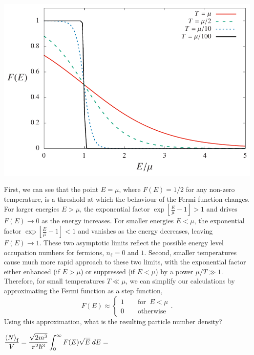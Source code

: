 \begin{center}\includegraphics[width=\textwidth]{figs/week09_dist.pdf}\end{center}

First, we can see that the point $E = \mu$, where $F(E) = 1 / 2$ for any non-zero temperature, is a threshold at which the behaviour of the Fermi function changes.
For larger energies $E > \mu$, the exponential factor $\exp\left[\frac{E}{\mu} - 1\right] > 1$ and drives $F(E) \to 0$ as the energy increases.
For smaller energies $E < \mu$, the exponential factor $\exp\left[\frac{E}{\mu} - 1\right] < 1$ and vanishes as the energy decreases, leaving $F(E) \to 1$.
These two asymptotic limits reflect the possible energy level occupation numbers for fermions, $n_{\ell} = 0$ and $1$.
Second, smaller temperatures cause much more rapid approach to these two limits, with the exponential factor either enhanced (if $E > \mu$) or suppressed (if $E < \mu$) by a power $\mu / T \gg 1$.
Therefore, for small temperatures $T \ll \mu$, we can simplify our calculations by approximating the Fermi function as a step function,
\begin{equation}
  \label{eq:Fermi_step}
  F(E) \approx \left\{\begin{array}{l}1 \qquad \mbox{for } \ E < \mu \\
                                      0 \qquad \mbox{otherwise}\end{array}\right. .
\end{equation}
Using this approximation, what is the resulting particle number density?
\begin{mdframed}
  $\displaystyle \frac{\left\langle N \right\rangle_{\text{f}}}{V} = \frac{\sqrt{2m^3}}{\pi^2 \hbar^3} \int_0^{\infty} F(E) \sqrt{E} \; dE = $ \\[100 pt]
\end{mdframed}

